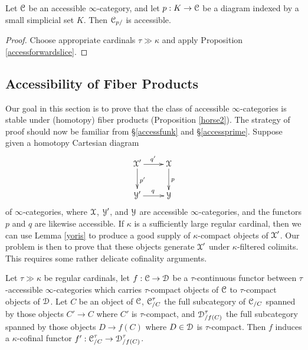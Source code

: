 \begin{corollary}\label{horsemn}
Let $\operatorname{\mathcal{C}}$ be an accessible $\infty$-category, and let $p:K \rightarrow \operatorname{\mathcal{C}}$ be a diagram indexed by a small simplicial set $K$. Then $\operatorname{\mathcal{C}}_{p/}$ is accessible.
\end{corollary}

\begin{proof}
Choose appropriate cardinals $\tau \gg \kappa$ and apply Proposition \ref{accessforwardslice}.
\end{proof}

\subsection{Accessibility of Fiber Products}\label{accessfiber}

Our goal in this section is to prove that the class of accessible $\infty$-categories is stable under (homotopy) fiber products (Proposition \ref{horse2}). The strategy of proof should now be familiar from \S \ref{accessfunk} and \S \ref{accessprime}. Suppose given a homotopy Cartesian diagram
 $$ \xymatrix{ \calX' \ar[r]^{q'} \ar[d]^{p'} & \calX \ar[d]^{p} \\
\calY' \ar[r]^{q} & \calY }$$
of $\infty$-categories, where $\operatorname{\mathcal{X}}$, $\operatorname{\mathcal{Y}}'$, and $\operatorname{\mathcal{Y}}$ are accessible $\infty$-categories, and the functors $p$ and $q$ are likewise accessible. If $\kappa$ is a sufficiently large regular cardinal, then we can use Lemma \ref{yoris} to produce a good supply of $\kappa$-compact objects of $\operatorname{\mathcal{X}}'$. Our problem is then to prove that these objects generate $\operatorname{\mathcal{X}}'$ under $\kappa$-filtered colimits. This requires some rather delicate cofinality arguments.

\begin{lemma}\label{supwolf}
Let $\tau \gg \kappa$ be regular cardinals, let $f: \operatorname{\mathcal{C}} \rightarrow \operatorname{\mathcal{D}}$ be a $\tau$-continuous
functor between $\tau$-accessible $\infty$-categories which carries $\tau$-compact objects
of $\operatorname{\mathcal{C}}$ to $\tau$-compact objects of $\operatorname{\mathcal{D}}$. Let $C$ be an object of $\operatorname{\mathcal{C}}$, $\operatorname{\mathcal{C}}^{\tau}_{/C}$ the full subcategory of $\operatorname{\mathcal{C}}_{/C}$ spanned by those objects $C' \rightarrow C$ where
$C'$ is $\tau$-compact, and $\operatorname{\mathcal{D}}^{\tau}_{/f(C)}$ the full subcategory spanned by those
objects $D \rightarrow f(C)$ where $D \in \operatorname{\mathcal{D}}$ is $\tau$-compact. Then $f$ induces
a $\kappa$-cofinal functor $f': \operatorname{\mathcal{C}}^{\tau}_{/C} \rightarrow \operatorname{\mathcal{D}}^{\tau}_{/f(C)}$. 
\end{lemma}

